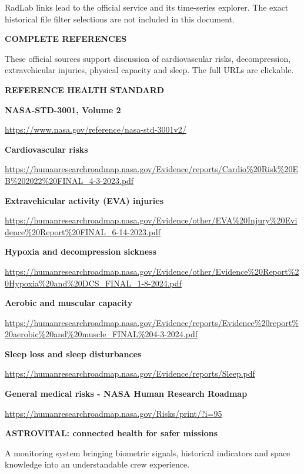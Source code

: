 \documentclass[10pt,a4paper]{article}
\newcommand{\heading}[2]{\par\vspace{8pt}{\large\bfseries\color{navy}#1}\hfill{\footnotesize\bfseries\color{blue}#2}\par\vspace{-1pt}{\color{blue}\rule{\linewidth}{1pt}}\vspace{3pt}}
\newcommand{\tinyhead}[1]{{\footnotesize\bfseries\color{blue}\MakeUppercase{#1}}}
\begin{document}
\vfill
{\footnotesize\color{muted}RadLab links lead to the official service and its time-series explorer. The exact historical file filter selections are not included in this document.}
\newpage
\heading{17  NASA space health reports}{COMPLETE REFERENCES}
These official sources support discussion of cardiovascular risks, decompression, extravehicular injuries, physical capacity and sleep. The full URLs are clickable.
\renewcommand{\arraystretch}{1.13}
\begin{infobox}
\tinyhead{Reference health standard}\par
\textbf{NASA-STD-3001, Volume 2}\par
\url{https://www.nasa.gov/reference/nasa-std-3001v2/}
\end{infobox}
\vspace{3pt}
{\small\bfseries\color{navy}Cardiovascular risks}\par
{\footnotesize\url{https://humanresearchroadmap.nasa.gov/Evidence/reports/Cardio%20Risk%20EB%202022%20FINAL_4-3-2023.pdf}}\par\vspace{6pt}
{\small\bfseries\color{navy}Extravehicular activity (EVA) injuries}\par
{\footnotesize\url{https://humanresearchroadmap.nasa.gov/Evidence/other/EVA%20Injury%20Evidence%20Report%20FINAL_6-14-2023.pdf}}\par\vspace{6pt}
{\small\bfseries\color{navy}Hypoxia and decompression sickness}\par
{\footnotesize\url{https://humanresearchroadmap.nasa.gov/Evidence/other/Evidence%20Report%20Hypoxia%20and%20DCS_FINAL_1-8-2024.pdf}}\par\vspace{6pt}
{\small\bfseries\color{navy}Aerobic and muscular capacity}\par
{\footnotesize\url{https://humanresearchroadmap.nasa.gov/Evidence/reports/Evidence%20report%20aerobic%20and%20muscle_FINAL%204-3-2024.pdf}}\par\vspace{6pt}
{\small\bfseries\color{navy}Sleep loss and sleep disturbances}\par
{\footnotesize\url{https://humanresearchroadmap.nasa.gov/Evidence/reports/Sleep.pdf}}\par\vspace{6pt}
{\small\bfseries\color{navy}General medical risks - NASA Human Research Roadmap}\par
{\footnotesize\url{https://humanresearchroadmap.nasa.gov/Risks/print/?i=95}}\par
\vfill
\begin{navybox}
{\color{white}\bfseries ASTROVITAL: connected health for safer missions}\par
{\color{white}A monitoring system bringing biometric signals, historical indicators and space knowledge into an understandable crew experience.}
\end{navybox}
\end{document}
